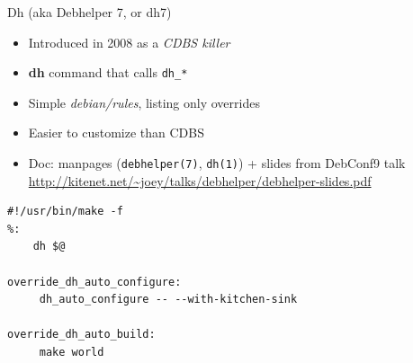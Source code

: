 \documentclass[10pt,final]{beamer}
\begin{document}
\begin{frame}[fragile]{Dh (aka Debhelper 7, or dh7)}
  \begin{itemize}
  \item Introduced in 2008 as a \textsl{CDBS killer}
    \hbr
  \item \textbf{dh} command that calls \texttt{dh\_*}
    \hbr
  \item Simple \textsl{debian/rules}, listing only overrides
    \hbr
  \item Easier to customize than CDBS
    \hbr
  \item Doc: manpages (\texttt{debhelper(7)}, \texttt{dh(1)}) + slides from DebConf9 talk\\
    \url{http://kitenet.net/~joey/talks/debhelper/debhelper-slides.pdf}
  \end{itemize}
  \seprule
    \begin{lstlisting}[basicstyle=\ttfamily\footnotesize]
#!/usr/bin/make -f
%:
    dh $@

override_dh_auto_configure:
     dh_auto_configure -- --with-kitchen-sink

override_dh_auto_build:
     make world

    \end{lstlisting}
\end{frame}
\end{document}
